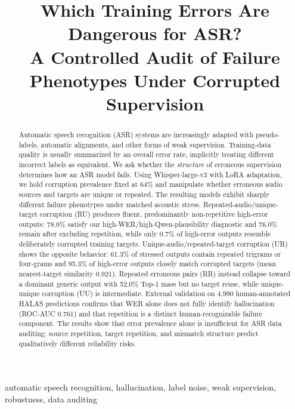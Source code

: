 \documentclass[conference]{IEEEtran}
\begin{document}
\title{Which Training Errors Are Dangerous for ASR?\\
A Controlled Audit of Failure Phenotypes Under Corrupted Supervision}
\author{}
\maketitle

\begin{abstract}
Automatic speech recognition (ASR) systems are increasingly adapted with
pseudo-labels, automatic alignments, and other forms of weak supervision.
Training-data quality is usually summarized by an overall error rate, implicitly
treating different incorrect labels as equivalent. We ask whether the
\emph{structure} of erroneous supervision determines how an ASR model fails.
Using Whisper-large-v3 with LoRA adaptation, we hold corruption prevalence fixed
at 64\% and manipulate whether erroneous audio sources and targets are unique or
repeated. The resulting models exhibit sharply different failure phenotypes
under matched acoustic stress. Repeated-audio/unique-target corruption (RU)
produces fluent, predominantly non-repetitive high-error outputs: 78.0\% satisfy
our high-WER/high-Qwen-plausibility diagnostic and 76.0\% remain after excluding
repetition, while only 0.7\% of high-error outputs resemble deliberately
corrupted training targets. Unique-audio/repeated-target corruption (UR) shows
the opposite behavior: 61.3\% of stressed outputs contain repeated trigrams or
four-grams and 95.3\% of high-error outputs closely match corrupted targets
(mean nearest-target similarity 0.921). Repeated erroneous pairs (RR) instead
collapse toward a dominant generic output with 52.0\% Top-1 mass but no target
reuse, while unique-unique corruption (UU) is intermediate. External validation
on 4,990 human-annotated HALAS predictions confirms that WER alone does not
fully identify hallucination (ROC-AUC 0.761) and that repetition is a distinct
human-recognizable failure component. The results show that error prevalence
alone is insufficient for ASR data auditing: source repetition, target
repetition, and mismatch structure predict qualitatively different reliability
risks.
\end{abstract}

\begin{IEEEkeywords}
automatic speech recognition, hallucination, label noise, weak supervision,
robustness, data auditing
\end{IEEEkeywords}
\end{document}
